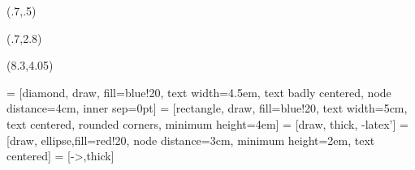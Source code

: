 \usepackage{bm,booktabs,animate,ragged2e,multicol,microtype,hyperref}

\graphicspath{{../figs/}{figs/}}
\def\full#1{\vspace*{0.15cm}\centerline{\texttt{[image: \#1]}}}

\fontsize{13}{15}\sf
\usepackage[scale=0.85]{sourcecodepro}
\usepackage{fontawesome}

{
\begin{textblock}{7.5}(.7,.5)\fontsize{24}{26}\sf
{\color[RGB]{73,129,175}\raggedright{}\par\inserttitle}
\end{textblock}
\begin{textblock}{7.5}(.7,2.8)
{\fontsize{15}{15}\sf\color{Orange}\raggedright{\insertauthor}}
\end{textblock}
\begin{textblock}{7.5}(8.3,4.05)
{\fontsize{9}{9}\sf\color{Orange}\insertdate}
\end{textblock}
}




\def\E{\text{E}}
\def\V{\text{Var}}
\def\up#1{\raisebox{-0.3cm}{#1}}
\def\pred#1#2#3{\hat{#1}_{#2|#3}}
\def\damped{$_\text{d}$}
\def\h+{h_{m}^{+}}
\def\st#1{\rlap{#1}\textcolor{red}{\rule{1cm}{0.1cm}}}
\def\bY{\bm{y}}
\def\by{\bm{y}}
\def\bS{\bm{S}}
\def\bI{\text{\rm\textbf{I}}}
\def\bbeta{\bm{\beta}}
\def\bSigma{\bm{\Sigma}}
\def\bW{\bm{\Sigma}}
\def\Var{\text{Var}}
\def\var{\text{Var}}
\def\bOmega{\bm{\Omega}}
\def\bLambda{\bm{\Lambda}}
\let\mc\multicolumn
\def\hl{\color[RGB]{230, 172, 0}}



\usepackage{tikz}

\usetikzlibrary{trees,shapes,arrows,matrix}
 = [diamond, draw, fill=blue!20,
    text width=4.5em, text badly centered, node distance=4cm, inner sep=0pt]
 = [rectangle, draw, fill=blue!20,
    text width=5cm, text centered, rounded corners, minimum height=4em]
 = [draw, thick, -latex']
 = [draw, ellipse,fill=red!20, node distance=3cm,
    minimum height=2em, text centered]
 = [->,thick]
